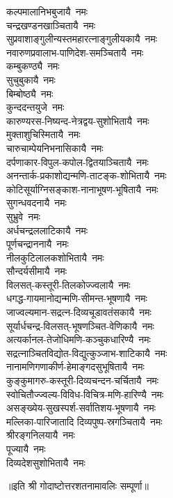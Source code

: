 \begin{multicols}{2}
\begin{flushleft}
कल्पमालानिभबुजायै~नमः\\
चन्द्रखण्डनखाञ्चितायै~नमः\hfill{}\\
सुप्रवाशाङ्गुलीन्यस्तमहा\-रत्नाङ्गुलीयकायै~नमः\\
नवारुणप्रवालाभ-पाणिदेश-समञ्चितायै~नमः\\
कम्बुकण्ठ्यै~नमः\\
सुचुबुकायै~नमः\\
बिम्बोष्ठ्यै~नमः\\
कुन्ददन्तयुजे~नमः\\
कारुण्यरस-निष्यन्द-नेत्रद्वय-सुशोभितायै~नमः\\
मुक्ताशुचिस्मितायै~नमः\\
चारुचाम्पेयनिभनासिकायै~नमः\\
दर्पणाकार-विपुल-कपोल-द्वितयाञ्चितायै~नमः\hfill{}\\
अनन्तार्क-प्रकाशोद्यन्मणि-ताटङ्क-शोभितायै~नमः\\
कोटिसूर्याग्निसङ्काश-नानाभूषण-भूषितायै~नमः\\
सुगन्धवदनायै~नमः\\
सुभ्रुवे~नमः\\
अर्धचन्द्रललाटिकायै~नमः\\
पूर्णचन्द्राननायै~नमः\\
नीलकुटिलालकशोभितायै~नमः\\
सौन्दर्यसीमायै~नमः\\
विलसत्-कस्तूरी-तिलकोज्ज्वलायै~नमः\\
धगद्ध-गायमानोद्यन्मणि-सीमन्त-भूषणायै~नमः\hfill{}\\
जाज्वल्यमान-सद्रत्न-दिव्यचूडावतंसकायै~नमः\\
सूर्यार्धचन्द्र-विलसत्-भूषणञ्चित-वेणिकायै~नमः\\
अत्यर्कानल-तेजोधिमणि-कञ्चुकधारिण्यै~नमः\\
सद्रत्नाञ्चितविद्योत-विद्युत्कुञ्जाभ-शाटिकायै~नमः\\
नानामणिगणाकीर्ण-हेमाङ्गदसुभूषितायै~नमः\\
कुङ्कुमागरु-कस्तूरी-दिव्यचन्दन-चर्चितायै~नमः\\
स्वोचितौज्ज्वल्य-विविध-विचित्र-मणि-हारिण्यै~नमः\\
असङ्ख्येय-सुखस्पर्श-सर्वातिशय-भूषणायै~नमः\\
मल्लिका-पारिजातादि  दिव्यपुष्प-स्रगञ्चितायै~नमः\\
श्रीरङ्गनिलयायै~नमः\hfill{}\\
पूज्यायै~नमः\\
दिव्यदेशसुशोभितायै~नमः\\
\end{flushleft}
\end{multicols}
॥इति श्री गोदाष्टोत्तरशतनामावलिः सम्पूर्णा॥
